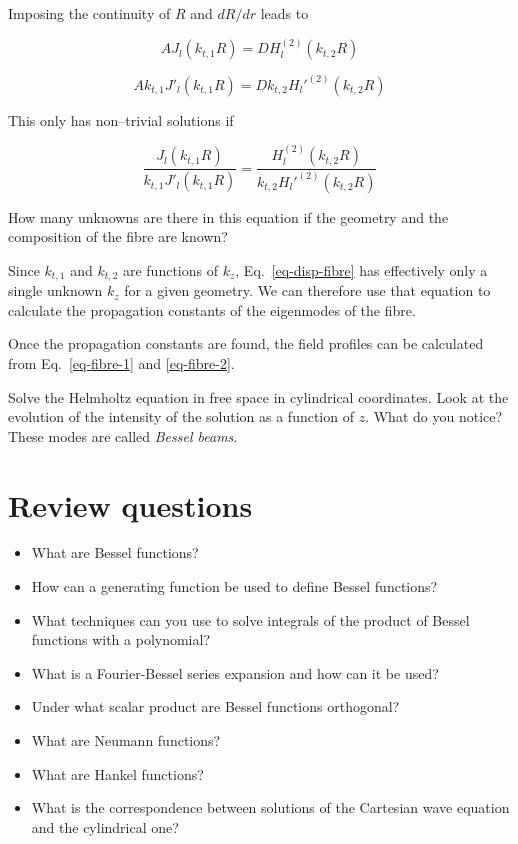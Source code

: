 Imposing the continuity of $R$ and $d R / dr$ leads to

\begin{equation}
A J_l\left(k_{t,1}R\right) = D H_l^{(2)}\left(k_{t,2}R\right)
\end{equation} 

\begin{equation}
A k_{t,1} J'_l\left(k_{t,1}R\right) = D k_{t,2} H_l'^{(2)}\left(k_{t,2}R\right)
\end{equation} 

This only has non--trivial solutions if

\begin{equation}
\frac{J_l\left(k_{t,1}R\right)}{k_{t,1} J'_l\left(k_{t,1}R\right)} = \frac{H_l^{(2)}\left(k_{t,2}R\right)}{k_{t,2} H_l'^{(2)}\left(k_{t,2}R\right)} \label{eq-disp-fibre}
\end{equation}

\begin{cue}
How many unknowns are there in this equation if the geometry and the composition of the fibre are known?  
\end{cue}

Since $k_{t,1}$ and $k_{t,2}$ are functions of $k_z$, Eq.~\ref{eq-disp-fibre} has effectively only a single unknown $k_z$ for a given geometry. We can therefore use that equation to calculate the propagation constants of the eigenmodes of the fibre.

Once the propagation constants are found, the field profiles can be calculated from Eq.~\ref{eq-fibre-1} and \ref{eq-fibre-2}.


\begin{exer}
Solve the Helmholtz equation in free space in cylindrical coordinates. Look at the evolution of the intensity of the solution as a function of $z$. What do you notice? These modes are called \emph{Bessel beams}.
\end{exer}



\section*{Review questions}

\begin{itemize}
\item What are Bessel functions?  
\item How can a generating function be used to define Bessel functions?
\item What techniques can you use to solve integrals of the product of Bessel functions with a polynomial?
\item What is a Fourier-Bessel series expansion and how can it be used?
\item Under what scalar product are Bessel functions orthogonal?
\item What are Neumann functions?
\item What are Hankel functions?
\item What is the correspondence between solutions of the Cartesian wave equation and the cylindrical one?   
\end{itemize}

